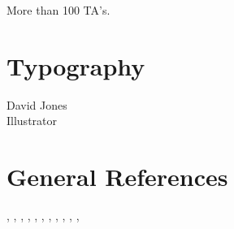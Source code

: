 More than 100 TA's.

\section*{Typography}

David Jones\\
Illustrator

\section{General References}

 \cite{Bender2005},
 \cite{Biggs2002},
 \cite{CormenLRS2009},   %
 \cite{Gersting2003},
 \cite{GoodaireP2001},
 \cite{HaggardSW2005},
 \cite{MR1952453},      %
 \cite{MichaelsR1991},
 \cite{Polya1957},
 \cite{Rosen2002},
 \cite{Schneierman2012},
 \cite{Strang1986}

\endinput
